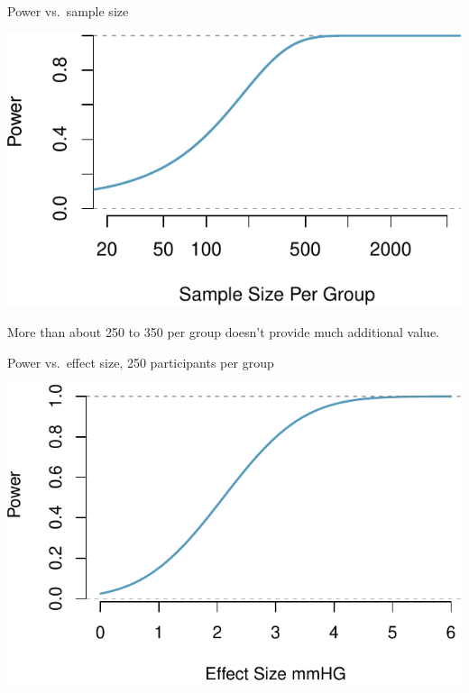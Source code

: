 \documentclass[ignorenonframetext,]{beamer}
\begin{document}
\begin{frame}{Power vs.~sample size}
\protect\hypertarget{power-vs.sample-size}{}

\small

\includegraphics{med_student_2019_files/figure-beamer/power_sample-1.pdf}

More than about 250 to 350 per group doesn't provide much additional
value.

\end{frame}

\begin{frame}{Power vs.~effect size, 250 participants per group}
\protect\hypertarget{power-vs.effect-size-250-participants-per-group}{}

\small

\includegraphics{med_student_2019_files/figure-beamer/power_effect-1.pdf}

\end{frame}
\end{document}
